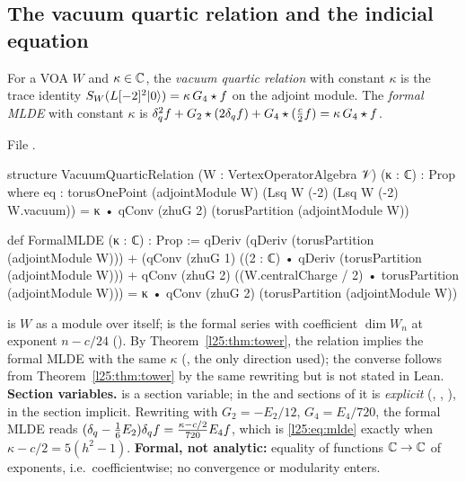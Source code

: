 \subsection{The vacuum quartic relation and the indicial equation}

\begin{definition}\label{l25:def:vqr}
For a VOA $W$ and $\kappa\in{\mathbb{C}}$, the \emph{vacuum quartic relation} with constant $\kappa$ is the trace identity
$S_W(L[-2]^2|0\rangle)=\kappa\,G_4\star f$ on the adjoint module. The \emph{formal MLDE} with constant $\kappa$ is
$\delta_q^2f+G_2\star(2\delta_q f)+G_4\star(\frac c2f)=\kappa\,G_4\star f$.
\end{definition}
\noindent File .
\begin{leancode}
structure VacuumQuarticRelation (W : VertexOperatorAlgebra 𝒱) (κ : ℂ) : Prop where
  eq : torusOnePoint (adjointModule W) (Lsq W (-2) (Lsq W (-2) W.vacuum))
    = κ • qConv (zhuG 2) (torusPartition (adjointModule W))

def FormalMLDE (κ : ℂ) : Prop :=
  qDeriv (qDeriv (torusPartition (adjointModule W)))
      + (qConv (zhuG 1) ((2 : ℂ) • qDeriv (torusPartition (adjointModule W)))
        + qConv (zhuG 2) ((W.centralCharge / 2) • torusPartition (adjointModule W)))
    = κ • qConv (zhuG 2) (torusPartition (adjointModule W))
\end{leancode}
\begin{dictionary}
 is $W$ as a module over itself;  is the formal series
with coefficient $\dim W_n$ at exponent $n-c/24$ (). By
Theorem~\ref{l25:thm:tower}, the relation implies the formal MLDE with the same $\kappa$
(, the only direction used); the converse follows from
Theorem~\ref{l25:thm:tower} by the same rewriting but is not stated in Lean. \textbf{Section variables.}
 is a section variable; in the  and  sections of
 it is \emph{explicit} (, ,
), in the  section implicit. Rewriting with
$G_2=-E_2/12$, $G_4=E_4/720$, the formal MLDE reads $(\delta_q-\frac16E_2)\delta_q f=\frac{\kappa-c/2}{720}E_4f$, which
is \eqref{l25:eq:mlde} exactly when $\kappa-c/2=5(h^2-1)$. \textbf{Formal, not analytic:} equality of functions
${\mathbb{C}}\to{\mathbb{C}}$ of exponents, i.e.\ coefficientwise; no convergence or modularity enters.
\end{dictionary}
